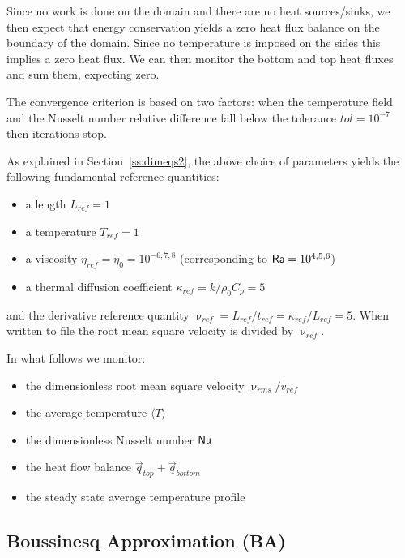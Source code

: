Since no work is done on the domain and there are no heat sources/sinks, we then 
expect that energy conservation yields a zero heat flux balance on the boundary of the domain. 
Since no temperature is imposed on the sides this implies a zero heat flux. 
We can then monitor the bottom and top heat fluxes and sum them, expecting zero.  

The convergence criterion is based on two factors: when the temperature field and the Nusselt number 
relative difference fall below the tolerance $tol=10^{-7}$ then iterations stop.

As explained in Section~\ref{ss:dimeqs2}, the above choice of parameters yields the following 
fundamental reference quantities:
\begin{itemize}
\item a length $L_{ref}=1$ 
\item a temperature $T_{ref}=1$ 
\item a viscosity $\eta_{ref}=\eta_0=10^{-6,7,8}$ (corresponding to ${\mathsf{Ra}}=10^{4,5,6}$) 
\item a thermal diffusion coefficient $\kappa_{ref}=k/\rho_0 C_p = 5$ 
\end{itemize}
and the derivative reference quantity $\upnu_{ref} = L_{ref} / t_{ref} = \kappa_{ref}/L_{ref} = 5$.
When written to file the root mean square velocity is divided by $\upnu_{ref}$.

In what follows we monitor:
\begin{itemize}
\item the dimensionless root mean square velocity $\upnu_{rms}/v_{ref}$
\item the average temperature $\langle T \rangle$
\item the dimensionless Nusselt number ${\mathsf{Nu}}$
\item the heat flow balance $\vec{q}_{top}+\vec{q}_{bottom}$
\item the steady state average temperature profile
\end{itemize}


\newpage
\subsection*{Boussinesq Approximation (BA)}

